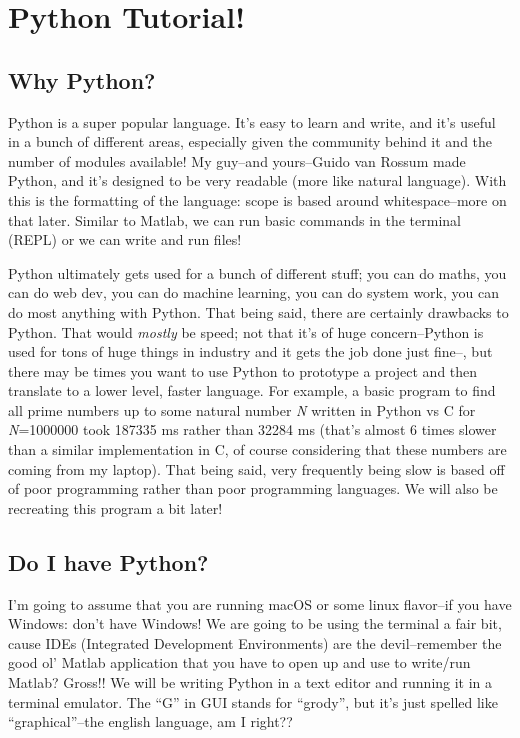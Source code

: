 \documentclass[12pt, twoside, reqno]{book}
\begin{document}
\chapter{Python Tutorial!}

\section{Why Python?}

Python is a super popular language. It's easy to learn and write, and it's useful in a bunch of different areas, especially given the community behind it and the number of modules available! My guy--and yours--Guido van Rossum made Python, and it's designed to be very readable (more like natural language). With this is the formatting of the language: scope is based around whitespace--more on that later. Similar to Matlab, we can run basic commands in the terminal (REPL) or we can write and run files!

Python ultimately gets used for a bunch of different stuff; you can do maths, you can do web dev, you can do machine learning, you can do system work, you can do most anything with Python. That being said, there are certainly drawbacks to Python. That would \textit{mostly} be speed; not that it's of huge concern--Python is used for tons of huge things in industry and it gets the job done just fine--, but there may be times you want to use Python to prototype a project and then translate to a lower level, faster language. For example, a basic program to find all prime numbers up to some natural number \textit{N} written in Python vs C for \textit{N}=1000000 took 187335 ms rather than 32284 ms (that's almost 6 times slower than a similar implementation in C, of course considering that these numbers are coming from my laptop). That being said, very frequently being slow is based off of poor programming rather than poor programming languages. We will also be recreating this program a bit later!

\section{Do I have Python?}

I'm going to assume that you are running macOS or some linux flavor--if you have Windows: don't have Windows! We are going to be using the terminal a fair bit, cause IDEs (Integrated Development Environments) are the devil--remember the good ol' Matlab application that you have to open up and use to write/run Matlab? Gross!! We will be writing Python in a text editor and running it in a terminal emulator. The ``G'' in GUI stands for ``grody'', but it's just spelled like ``graphical''--the english language, am I right??
\end{document}

